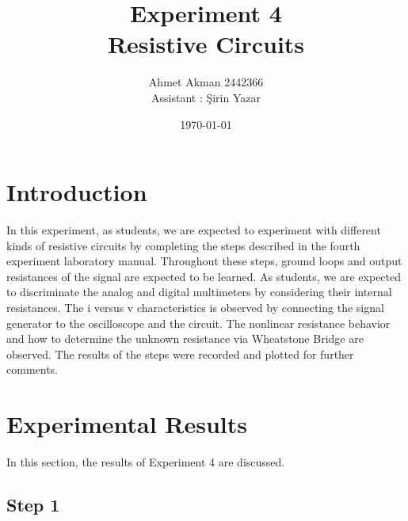 \documentclass[letterpaper,12pt]{article}
\begin{document}
\title{Experiment 4 \protect\\Resistive Circuits}
\author{Ahmet Akman 2442366 \protect\\ Assistant : Şirin Yazar}
\date{\today}
\maketitle


\section{Introduction} 
In this experiment, as students, we are expected to experiment with different kinds of resistive circuits by completing the steps described in the fourth experiment laboratory manual. Throughout these steps, ground loops and output resistances of the signal are expected to be learned. As students, we are expected to discriminate the analog and digital multimeters by considering their internal resistances. The i versus v characteristics is observed by connecting the signal generator to the oscilloscope and the circuit. The nonlinear resistance behavior and how to determine the unknown resistance via Wheatstone Bridge are observed. The results of the steps were recorded and plotted for further comments.
\section{Experimental Results}
In this section, the results of Experiment 4 are discussed.
\subsection{Step 1}
\end{document}
